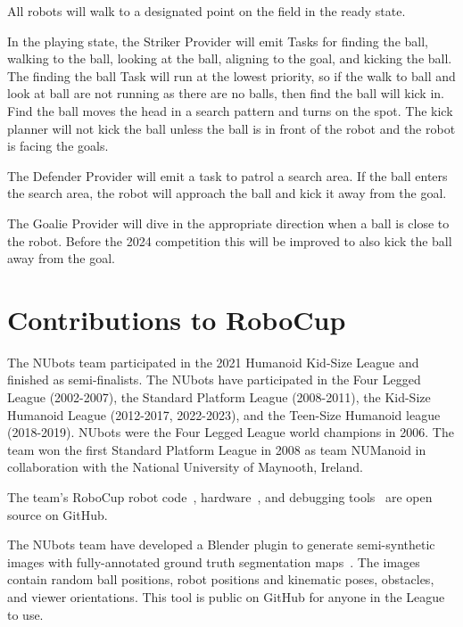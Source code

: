 \documentclass{llncs}
\begin{document}
All robots will walk to a designated point on the field in the ready state. 

In the playing state, the Striker Provider will emit Tasks for finding the ball, walking to the ball, looking at the ball, aligning to the goal, and kicking the ball. The finding the ball Task will run at the lowest priority, so if the walk to ball and look at ball are not running as there are no balls, then find the ball will kick in. Find the ball moves the head in a search pattern and turns on the spot. The kick planner will not kick the ball unless the ball is in front of the robot and the robot is facing the goals. 

The Defender Provider will emit a task to patrol a search area. If the ball enters the search area, the robot will approach the ball and kick it away from the goal.

The Goalie Provider will dive in the appropriate direction when a ball is close to the robot. Before the 2024 competition this will be improved to also kick the ball away from the goal.

\medskip

\section{Contributions to RoboCup}


The NUbots team participated in the 2021 Humanoid Kid-Size League and finished as semi-finalists. The NUbots have participated in the Four Legged League (2002-2007), the Standard Platform League (2008-2011), the Kid-Size Humanoid League (2012-2017, 2022-2023), and the Teen-Size Humanoid league (2018-2019). NUbots were the Four Legged League world champions in 2006. The team won the first Standard Platform League in 2008 as team NUManoid in collaboration with the National University of Maynooth, Ireland.

The team's RoboCup robot code~\cite{nubotsGit}, hardware~\cite{nubotsHardwareGit}, and debugging tools~\cite{nubotsNUsightGit} are open source on GitHub. 

The NUbots team have developed a Blender plugin to generate semi-synthetic images with fully-annotated ground truth segmentation maps~\cite{nubotsNUpbrGit}. The images contain random ball positions, robot positions and kinematic poses, obstacles, and viewer orientations. This tool is public on GitHub for anyone in the League to use.
\end{document}

